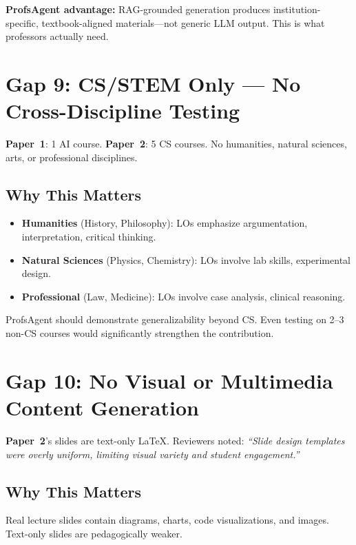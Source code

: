 \documentclass[11pt,a4paper]{article}
\begin{document}
\begin{greenbox}
\textbf{ProfsAgent advantage:} RAG-grounded generation produces institution-specific, textbook-aligned materials---not generic LLM output. This is what professors actually need.
\end{greenbox}

\section{Gap 9: CS/STEM Only --- No Cross-Discipline Testing}

\textbf{Paper~1}: 1 AI course. \textbf{Paper~2}: 5 CS courses. No humanities, natural sciences, arts, or professional disciplines.

\subsection{Why This Matters}
\begin{itemize}[nosep]
    \item \textbf{Humanities} (History, Philosophy): LOs emphasize argumentation, interpretation, critical thinking.
    \item \textbf{Natural Sciences} (Physics, Chemistry): LOs involve lab skills, experimental design.
    \item \textbf{Professional} (Law, Medicine): LOs involve case analysis, clinical reasoning.
\end{itemize}

ProfsAgent should demonstrate generalizability beyond CS. Even testing on 2--3 non-CS courses would significantly strengthen the contribution.

\section{Gap 10: No Visual or Multimedia Content Generation}

\textbf{Paper~2}'s slides are text-only LaTeX. Reviewers noted: \textit{``Slide design templates were overly uniform, limiting visual variety and student engagement.''}

\subsection{Why This Matters}
Real lecture slides contain diagrams, charts, code visualizations, and images. Text-only slides are pedagogically weaker.
\end{document}
